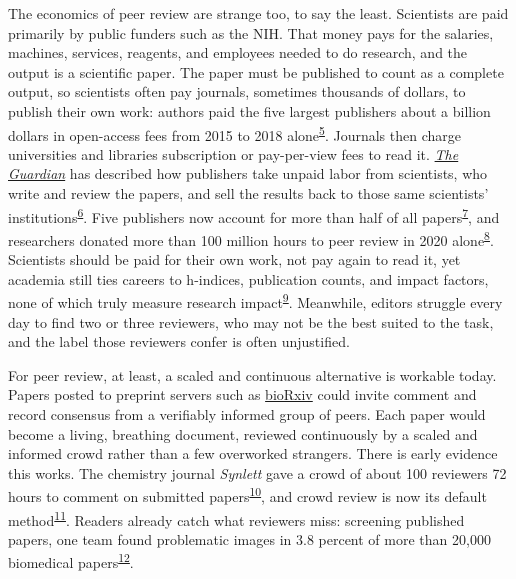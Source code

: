 \documentclass[12pt]{article}
\begin{document}
The economics of peer review are strange too, to say the least. Scientists are paid primarily by public funders such as the NIH. That money pays for the salaries, machines, services, reagents, and employees needed to do research, and the output is a scientific paper. The paper must be published to count as a complete output, so scientists often pay journals, sometimes thousands of dollars, to publish their own work: authors paid the five largest publishers about a billion dollars in open-access fees from 2015 to 2018 alone\textsuperscript{\hyperlink{ref-butler2023}{5}}. Journals then charge universities and libraries subscription or pay-per-view fees to read it. \href{https://www.theguardian.com/science/2017/jun/27/profitable-business-scientific-publishing-bad-for-science}{\textit{The Guardian}} has described how publishers take unpaid labor from scientists, who write and review the papers, and sell the results back to those same scientists' institutions\textsuperscript{\hyperlink{ref-buranyi2017}{6}}. Five publishers now account for more than half of all papers\textsuperscript{\hyperlink{ref-lariviere2015}{7}}, and researchers donated more than 100 million hours to peer review in 2020 alone\textsuperscript{\hyperlink{ref-aczel2021}{8}}. Scientists should be paid for their own work, not pay again to read it, yet academia still ties careers to h-indices, publication counts, and impact factors, none of which truly measure research impact\textsuperscript{\hyperlink{ref-koltun2021}{9}}. Meanwhile, editors struggle every day to find two or three reviewers, who may not be the best suited to the task, and the label those reviewers confer is often unjustified.

For peer review, at least, a scaled and continuous alternative is workable today. Papers posted to preprint servers such as \href{https://www.biorxiv.org/}{bioRxiv} could invite comment and record consensus from a verifiably informed group of peers. Each paper would become a living, breathing document, reviewed continuously by a scaled and informed crowd rather than a few overworked strangers. There is early evidence this works. The chemistry journal \textit{Synlett} gave a crowd of about 100 reviewers 72 hours to comment on submitted papers\textsuperscript{\hyperlink{ref-ritter2017}{10}}, and crowd review is now its default method\textsuperscript{\hyperlink{ref-vangemmeren2020}{11}}. Readers already catch what reviewers miss: screening published papers, one team found problematic images in 3.8 percent of more than 20,000 biomedical papers\textsuperscript{\hyperlink{ref-bik2016}{12}}.
\end{document}
